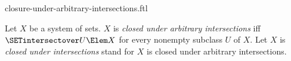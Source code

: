 \documentclass{stex}
\begin{document}
\begin{smodule}{closure-under-arbitrary-intersections.ftl}

\begin{definition}[forthel]
  Let $X$ be a system of sets.
  $X$ is \emph{closed under arbitrary intersections} iff $\SETintersectover U \Elem X$ for every nonempty subclass $U$ of $X$.
  Let $X$ is \emph{closed under intersections} stand for $X$ is closed under arbitrary intersections.
\end{definition}
\end{smodule}
\end{document}
